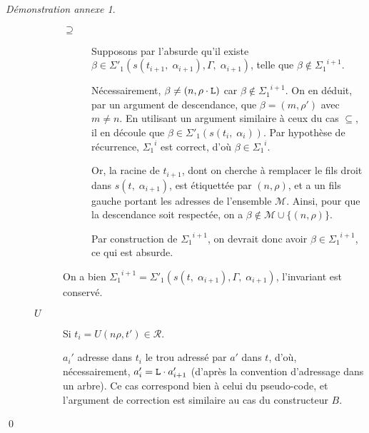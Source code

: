 \documentclass[11pt,a4paper]{article}
\theoremstyle{plain}
\theoremstyle{definition}
\theoremstyle{remark}
\newtheorem{demonstrationappendix}{Démonstration annexe}
\newcommand*{\someadd}{\rho}
\newcommand*{\sequent}{\Gamma}
\newcommand*{\Left}{\textnormal{\texttt{L}}}
\newcommand*{\representations}{\ensuremath{\mathcal{R}}}
\newcommand*{\highapprox}{\ensuremath{\Sigma_1}}
\newcommand*{\highapproxspec}{\ensuremath{\Sigma'_1}}
\newcommand*{\treesimplify}{\ensuremath{s}}
\begin{document}
\begin{demonstrationappendix}
\begin{description}
\begin{description}
\begin{description}
                \item[$\supseteq$]
                    Supposons par l'absurde qu'il existe $\beta \in \highapproxspec \left( \treesimplify( t_{i+1}, \; {\alpha}_{i+1} ), \sequent, \; {\alpha}_{i+1} \right)$, telle que $\beta \notin {\highapprox}^{i+1}$. 
                    
                    Nécessairement, $\beta \neq (n, \someadd \cdot \Left)$ car $\beta \notin {\highapprox}^{i+1}$. On en déduit, par un argument de descendance, que $\beta = (m, \someadd')$ avec $m \neq n$. En utilisant un argument similaire à ceux du cas $\subseteq$, il en découle que $\beta \in \highapproxspec \left( \treesimplify( t_{i}, \; {\alpha}_{i} ) \right)$. Par hypothèse de récurrence, ${\highapprox}^{i}$ est correct, d'où $\beta \in {\highapprox}^{i}$.
                    
                    Or, la racine de $t_{i+1}$, dont on cherche à remplacer le fils droit dans $\treesimplify( t, \; {\alpha}_{i+1} )$, est étiquettée par $(n, \rho)$, et a un fils gauche portant les adresses de l'ensemble $\mathcal{M}$. Ainsi, pour que la descendance soit respectée, on a $\beta \notin \mathcal{M} \cup \{ (n, \someadd) \}$.

                    Par construction de ${\highapprox}^{i+1}$, on devrait donc avoir $\beta \in {\highapprox}^{i+1}$, ce qui est absurde.
            \end{description}

            On a bien ${\highapprox}^{i+1} = \highapproxspec \left( \treesimplify( t, \; {\alpha}_{i+1} ), \sequent, \; {\alpha}_{i+1} \right)$, l'invariant est conservé.
    
            \item[$U$] Si $t_i = U(n\rho, t') \in \representations$.
    
            $a_i'$ adresse dans $t_i$ le trou adressé par $a'$ dans $t$, d'où, nécessairement, $a_i' = \Left \cdot a_{i+1}'$ (d'après la convention d'adressage dans un arbre). Ce cas correspond bien à celui du pseudo-code, et l'argument de correction est similaire au cas du constructeur $B$. 
        \end{description}
    \end{description}

    \qed{}
\end{demonstrationappendix}
\end{document}

